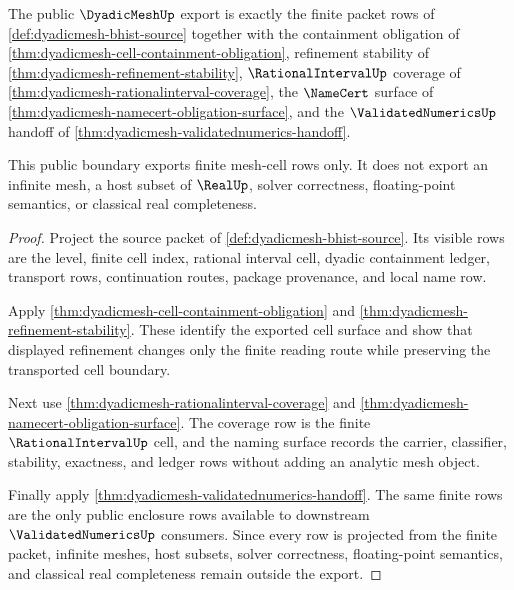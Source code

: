 \begin{theorem}
\label{thm:dyadicmesh-public-export-boundary}
The public $\DyadicMeshUp$ export is exactly the finite packet rows of
\autoref{def:dyadicmesh-bhist-source} together with the containment obligation
of \autoref{thm:dyadicmesh-cell-containment-obligation}, refinement stability
of \autoref{thm:dyadicmesh-refinement-stability}, $\RationalIntervalUp$
coverage of \autoref{thm:dyadicmesh-rationalinterval-coverage}, the
$\NameCert$ surface of
\autoref{thm:dyadicmesh-namecert-obligation-surface}, and the
$\ValidatedNumericsUp$ handoff of
\autoref{thm:dyadicmesh-validatednumerics-handoff}.

This public boundary exports finite mesh-cell rows only. It does not export an
infinite mesh, a host subset of $\RealUp$, solver correctness,
floating-point semantics, or classical real completeness.
\end{theorem}
\begin{proof}
Project the source packet of \autoref{def:dyadicmesh-bhist-source}. Its visible
rows are the level, finite cell index, rational interval cell, dyadic
containment ledger, transport rows, continuation routes, package provenance,
and local name row.

Apply \autoref{thm:dyadicmesh-cell-containment-obligation} and
\autoref{thm:dyadicmesh-refinement-stability}. These identify the exported
cell surface and show that displayed refinement changes only the finite
reading route while preserving the transported cell boundary.

Next use \autoref{thm:dyadicmesh-rationalinterval-coverage} and
\autoref{thm:dyadicmesh-namecert-obligation-surface}. The coverage row is the
finite $\RationalIntervalUp$ cell, and the naming surface records the carrier,
classifier, stability, exactness, and ledger rows without adding an analytic
mesh object.

Finally apply \autoref{thm:dyadicmesh-validatednumerics-handoff}. The same
finite rows are the only public enclosure rows available to downstream
$\ValidatedNumericsUp$ consumers. Since every row is projected from the finite
packet, infinite meshes, host subsets, solver correctness, floating-point
semantics, and classical real completeness remain outside the export.
\end{proof}

